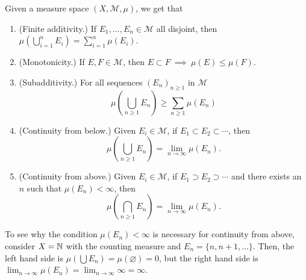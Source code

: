 \documentclass[11pt,leqno,oneside]{amsbook}
\numberwithin{thm}{section}
\newcommand{\M}{\mathcal{M}} %
\renewcommand{\emptyset}{\varnothing}
\begin{document}
\begin{thm}
  Given a measure space $(X,\M,\mu)$, we get that
  \begin{enumerate}
  \item (Finite additivity.) If $E_1, \ldots, E_n \in \M$ all disjoint,
    then $\mu(\bigcup_{i=1}^n E_i) = \sum_{i = 1}^n \mu(E_i)$.
  \item (Monotonicity.) If $E,F \in \M$, then $E \subset F \ \implies
    \ \mu(E) \leq \mu(F)$.
  \item (Subadditivity.) For all sequences $(E_n)_{n \geq 1}$ in
    $\M$ \[
      \mu\left( \bigcup_{n \geq 1} E_n \right) \geq \sum_{n \geq 1} \mu(E_n)
    \]
  \item (Continuity from below.) Given $E_i \in \M$, if $E_1 \subset
    E_2 \subset \cdots$,
    then \[
      \mu(\bigcup_{n \geq 1} E_n) = \lim_{n \to \infty} \mu(E_n).
    \]
  \item (Continuity from above.) Given $E_i \in \M$, if  $E_1 \supset
    E_2 \supset \cdots$ and there exists an $n$ such that $\mu(E_n) <
    \infty$,
    then \[
      \mu(\bigcap_{n \geq 1} E_n) = \lim_{n \to \infty} \mu(E_n).
    \]
  \end{enumerate}
\end{thm}
\begin{example}
  To see why the condition $\mu(E_n) < \infty$ is necessary for
  continuity from above, consider $X = {\mathbb N}$ with the counting measure
  and $E_n = \{n,n+1,\ldots\}$. Then, the left hand side is
  $\mu(\bigcup E_n) = \mu(\emptyset) = 0$, but the right hand side is
  $\lim_{n \to \infty} \mu(E_n) = \lim_{n \to \infty} \infty =
  \infty$.
\end{example}
\end{document}
